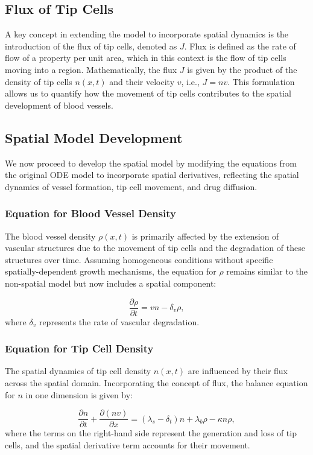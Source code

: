 \subsection{Flux of Tip Cells}
A key concept in extending the model to incorporate spatial dynamics is the introduction of the flux of tip cells, denoted as \(J\). Flux is defined as the rate of flow of a property per unit area, which in this context is the flow of tip cells moving into a region. Mathematically, the flux \(J\) is given by the product of the density of tip cells \(n(x,t)\) and their velocity \(v\), i.e., \(J = nv\). This formulation allows us to quantify how the movement of tip cells contributes to the spatial development of blood vessels.

\subsection{Spatial Model Development}
We now proceed to develop the spatial model by modifying the equations from the original ODE model to incorporate spatial derivatives, reflecting the spatial dynamics of vessel formation, tip cell movement, and drug diffusion.


\subsubsection{Equation for Blood Vessel Density}
The blood vessel density \(\rho(x,t)\) is primarily affected by the extension of vascular structures due to the movement of tip cells and the degradation of these structures over time. Assuming homogeneous conditions without specific spatially-dependent growth mechanisms, the equation for \(\rho\) remains similar to the non-spatial model but now includes a spatial component:

\begin{equation}
	\frac{\partial \rho}{\partial t} = vn - \delta_v \rho,
\end{equation}
where \(\delta_v\) represents the rate of vascular degradation.

\subsubsection{Equation for Tip Cell Density}
The spatial dynamics of tip cell density \(n(x,t)\) are influenced by their flux across the spatial domain. Incorporating the concept of flux, the balance equation for \(n\) in one dimension is given by:

\begin{equation}
	\frac{\partial n}{\partial t} + \frac{\partial (nv)}{\partial x} = (\lambda_s - \delta_t) n + \lambda_b \rho - \kappa n \rho,
\end{equation}
where the terms on the right-hand side represent the generation and loss of tip cells, and the spatial derivative term accounts for their movement.


